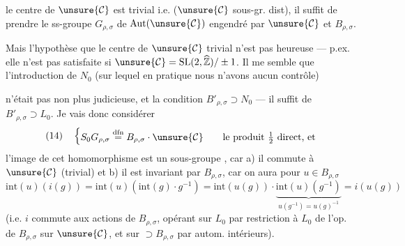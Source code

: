  le centre de $\unsure{\mathcal{C}}$ est trivial i.e.
($\unsure{\mathcal{C}}$ sous-gr. dist),
il suffit de prendre le ss-groupe $G_{\rho,\sigma}$ de $\mathrm{Aut}(\unsure{\mathcal{C}})$ engendré par $\unsure{\mathcal{C}}$ et $B_{\rho,\sigma}$.

Mais l'hypothèse que le centre de $\unsure{\mathcal{C}}$  trivial n'est pas heureuse --- p.ex. elle n'est pas satisfaite si $\unsure{\mathcal{C}}=\mathrm{SL}(2,\widehat{\mathbb Z})/\pm1$.
Il me semble que l'introduction de $N_0$ (sur lequel en pratique nous n'avons aucun contrôle)

n'était pas non plus judicieuse, et  la condition $B'_{\rho,\sigma}\supset N_0$ --- il suffit de $B'_{\rho,\sigma}\supset L_0$.
Je vais donc considérer
\[
(14)\quad\left\{\begin{gathered}
S_0G_{\rho,\sigma}\overset{\mathrm{dfn}}{=}B_{\rho,\sigma}\cdot\unsure{\mathcal{C}}\qquad\text{le produit }\tfrac12\text{ direct, et}
\end{gathered}\right.
\]
l'image de cet homomorphisme est un sous-groupe , car a) il commute à $\unsure{\mathcal{C}}$ (trivial) et b) il est invariant par $B_{\rho,\sigma}$, car on aura pour $u\in B_{\rho,\sigma}$
\[
\mathrm{int}(u)(i(g))=\mathrm{int}(u)(\mathrm{int}(g)\cdot g^{-1})
=\mathrm{int}(u(g))\cdot\underbrace{\mathrm{int}(u)(g^{-1})}_{u(g^{-1})=u(g)^{-1}}
=i(u(g))
\]
(i.e. $i$ commute aux actions de $B_{\rho,\sigma}$, opérant sur $L_0$ par restriction à $L_0$ de l'op.  de $B_{\rho,\sigma}$ sur $\unsure{\mathcal{C}}$, et sur  $\supset B_{\rho,\sigma}$ par autom. intérieurs).

